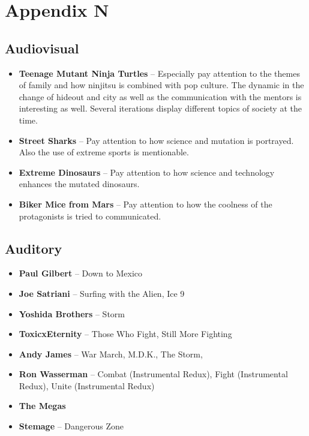\documentclass{book}
\begin{document}
\chapter*{Appendix N}

\section*{Audiovisual}
\begin{itemize}
    \item \textbf{Teenage Mutant Ninja Turtles} -- Especially pay attention to the themes of family and how ninjitsu is combined with pop culture. The dynamic in the change of hideout and city as well as the communication with the mentors is interesting as well. Several iterations display different topics of society at the time.
    \item \textbf{Street Sharks} -- Pay attention to how science and mutation is portrayed. Also the use of extreme sports is mentionable.
    \item \textbf{Extreme Dinosaurs} -- Pay attention to how science and technology enhances the mutated dinosaurs.
    \item \textbf{Biker Mice from Mars} -- Pay attention to how the coolness of the protagonists is tried to communicated.
\end{itemize}

\section*{Auditory}
\begin{itemize}
    \item \textbf{Paul Gilbert} -- Down to Mexico
    \item \textbf{Joe Satriani} -- Surfing with the Alien, Ice 9
    \item \textbf{Yoshida Brothers} -- Storm
    \item \textbf{ToxicxEternity} -- Those Who Fight, Still More Fighting
    \item \textbf{Andy James} -- War March, M.D.K., The Storm,
    \item \textbf{Ron Wasserman} -- Combat (Instrumental Redux), Fight (Instrumental Redux), Unite (Instrumental Redux)
    \item \textbf{The Megas}
    \item \textbf{Stemage} -- Dangerous Zone
\end{itemize}
\end{document}
